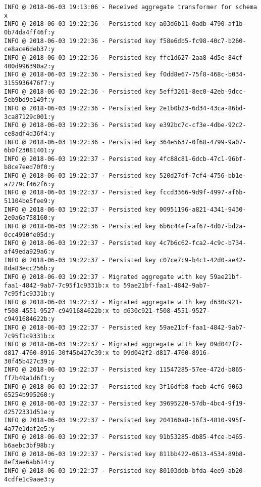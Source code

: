 \begin{lstlisting}[basicstyle=\small, label={testlog}, caption={De første 50 linjene i den applikasjonsloggen til tjeneren ''vbb-master2018-crabbe''' (se tabell \ref{droplets}) fra test 2.}]
INFO @ 2018-06-03 19:13:06 - Received aggregate transformer for schema x
INFO @ 2018-06-03 19:22:36 - Persisted key a03d6b11-0adb-4790-af1b-0b74da4ff46f:y
INFO @ 2018-06-03 19:22:36 - Persisted key f58e6db5-fc98-40c7-b260-ce8ace6deb37:y
INFO @ 2018-06-03 19:22:36 - Persisted key ffc1d627-2aa8-4d5e-84cf-400d996390a2:y
INFO @ 2018-06-03 19:22:36 - Persisted key f0dd8e67-75f8-468c-b034-3155936476f7:y
INFO @ 2018-06-03 19:22:36 - Persisted key 5eff3261-8ec0-42eb-9dcc-5eb9bd9e149f:y
INFO @ 2018-06-03 19:22:36 - Persisted key 2e1b0b23-6d34-43ca-86bd-3ca87129c001:y
INFO @ 2018-06-03 19:22:36 - Persisted key e392bc7c-cf3e-4dbe-92c2-ce8adf4d36f4:y
INFO @ 2018-06-03 19:22:36 - Persisted key 364e5637-0f68-4799-9a07-6b0f23081401:y
INFO @ 2018-06-03 19:22:37 - Persisted key 4fc88c81-6dcb-47c1-96bf-b8ce7eed70f0:y
INFO @ 2018-06-03 19:22:37 - Persisted key 520d27df-7cf4-4756-bb1e-a7279cf462f6:y
INFO @ 2018-06-03 19:22:37 - Persisted key fccd3366-9d9f-4997-af6b-51104be5fee9:y
INFO @ 2018-06-03 19:22:37 - Persisted key 00951196-a821-4341-9430-2e0a6a758160:y
INFO @ 2018-06-03 19:22:36 - Persisted key 6b6c44ef-af67-4d07-bd2a-0cc4990fe05d:y
INFO @ 2018-06-03 19:22:37 - Persisted key 4c7b6c62-fca2-4c9c-b734-af49eda929a6:y
INFO @ 2018-06-03 19:22:37 - Persisted key c07ce7c9-b4c1-42d0-ae42-8da83ecc256b:y
INFO @ 2018-06-03 19:22:37 - Migrated aggregate with key 59ae21bf-faa1-4842-9ab7-7c95f1c9331b:x to 59ae21bf-faa1-4842-9ab7-7c95f1c9331b:y
INFO @ 2018-06-03 19:22:37 - Migrated aggregate with key d630c921-f508-4551-9527-c9491684622b:x to d630c921-f508-4551-9527-c9491684622b:y
INFO @ 2018-06-03 19:22:37 - Persisted key 59ae21bf-faa1-4842-9ab7-7c95f1c9331b:x
INFO @ 2018-06-03 19:22:37 - Migrated aggregate with key 09d042f2-d817-4760-8916-30f45b427c39:x to 09d042f2-d817-4760-8916-30f45b427c39:y
INFO @ 2018-06-03 19:22:37 - Persisted key 11547285-57ee-472d-b865-ff7b49a1d6f1:y
INFO @ 2018-06-03 19:22:37 - Persisted key 3f16dfb8-faeb-4cf6-9063-65254b995260:y
INFO @ 2018-06-03 19:22:37 - Persisted key 39695220-57db-4bc4-9f19-d2572331d51e:y
INFO @ 2018-06-03 19:22:37 - Persisted key 204160a8-16f3-4810-995f-4a77e1daf2e5:y
INFO @ 2018-06-03 19:22:37 - Persisted key 91b53285-db85-4fce-b465-b6aebc3bf98b:y
INFO @ 2018-06-03 19:22:37 - Persisted key 811bb422-0613-4534-89b8-8ef3ae6ab614:y
INFO @ 2018-06-03 19:22:37 - Persisted key 80103ddb-bfda-4ee9-ab20-4cdfe1c9aae3:y

\end{lstlisting}

